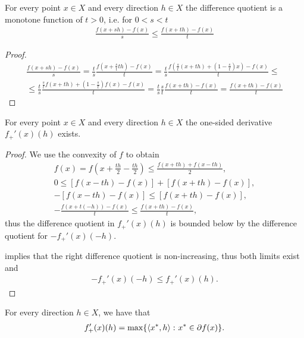 \begin{lemma}
  \label{thm:convex_difference_quotient_grows}
  For every point $x \in X$ and every direction $h \in X$ the difference quotient is a monotone function of $t > 0$, i.e. for $0 < s < t$
  \begin{align*}
    \frac {f(x + sh) - f(x)} s
    \leq
    \frac {f(x + th) - f(x)} t
  \end{align*}
\end{lemma}
\begin{proof}
  \begin{align*}
    \frac {f(x + sh) - f(x)} s
    =
    \frac t s \frac {f(x + \frac s t t h) - f(x)} t
    =
    \frac t s \frac {f\left(\frac s t (x + th) + (1 - \frac s t) x \right) - f(x)} t
    \leq \\ \leq
    \frac t s \frac {\frac s t f(x + t h) + (1 - \frac s t) f(x) - f(x)} t
    =
    \frac t s \frac s t \frac {f(x + th) - f(x)} t
    =
    \frac {f(x + th) - f(x)} t
  \end{align*}
\end{proof}

\begin{proposition}
  \label{thm:convex_one_sided_derivatives_exist}
  For every point $x \in X$ and every direction $h \in X$ the one-sided derivative $f_+'(x)(h)$ exists.
\end{proposition}
\begin{proof}
  We use the convexity of $f$ to obtain
  \begin{align*}
    f(x) = f \left(x + \frac {th} 2 - \frac {th} 2 \right) \leq \frac {f(x + th) + f(x - th)} 2,
    \\
    0 \leq [f(x - th) - f(x)] + [f(x + th) - f(x)],
    \\
    -[f(x - th) - f(x)] \leq [f(x + th) - f(x)],
    \\
    -\frac {f(x + t(-h)) - f(x)} t \leq \frac {f(x + th) - f(x)} t,
  \end{align*}
  thus the difference quotient in $f_+'(x)(h)$ is bounded below by the difference quotient for $-f_+'(x)(-h)$.

   implies that the right difference quotient is non-increasing, thus both limits exist and
  \begin{align*}
    -f_+'(x)(-h) \leq f_+'(x)(h).
  \end{align*}
\end{proof}

\begin{proposition}
  \label{thm:convex_one_sided_derivative_is_max}
  For every direction $h \in X$, we have that
  \begin{align*}
    f_+'(x)(h) = \max\{ \left\langle x^*, h \right\rangle \colon x^* \in \partial f(x) \}.
  \end{align*}
\end{proposition}

